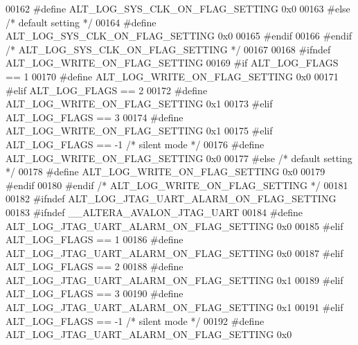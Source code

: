 \begin{DoxyCode}
{{{{00162 \textcolor{preprocessor}{            #define ALT\_LOG\_SYS\_CLK\_ON\_FLAG\_SETTING 0x0}
00163 \textcolor{preprocessor}{        #else }\textcolor{comment}{/* default setting */}\textcolor{preprocessor}{}
00164 \textcolor{preprocessor}{            #define ALT\_LOG\_SYS\_CLK\_ON\_FLAG\_SETTING 0x0}
00165 \textcolor{preprocessor}{        #endif}
00166 \textcolor{preprocessor}{    #endif }\textcolor{comment}{/* ALT\_LOG\_SYS\_CLK\_ON\_FLAG\_SETTING */}\textcolor{preprocessor}{}
00167 
00168 \textcolor{preprocessor}{    #ifndef ALT\_LOG\_WRITE\_ON\_FLAG\_SETTING}
00169 \textcolor{preprocessor}{        #if ALT\_LOG\_FLAGS == 1}
00170 \textcolor{preprocessor}{            #define ALT\_LOG\_WRITE\_ON\_FLAG\_SETTING 0x0}
00171 \textcolor{preprocessor}{        #elif ALT\_LOG\_FLAGS == 2}
00172 \textcolor{preprocessor}{            #define ALT\_LOG\_WRITE\_ON\_FLAG\_SETTING 0x1}
00173 \textcolor{preprocessor}{        #elif ALT\_LOG\_FLAGS == 3}
00174 \textcolor{preprocessor}{            #define ALT\_LOG\_WRITE\_ON\_FLAG\_SETTING 0x1}
00175 \textcolor{preprocessor}{        #elif ALT\_LOG\_FLAGS == -1 }\textcolor{comment}{/* silent mode */}\textcolor{preprocessor}{}
00176 \textcolor{preprocessor}{            #define ALT\_LOG\_WRITE\_ON\_FLAG\_SETTING 0x0}
00177 \textcolor{preprocessor}{        #else }\textcolor{comment}{/* default setting */}\textcolor{preprocessor}{}
00178 \textcolor{preprocessor}{            #define ALT\_LOG\_WRITE\_ON\_FLAG\_SETTING 0x0}
00179 \textcolor{preprocessor}{        #endif}
00180 \textcolor{preprocessor}{    #endif }\textcolor{comment}{/* ALT\_LOG\_WRITE\_ON\_FLAG\_SETTING */}\textcolor{preprocessor}{}
00181 
00182 \textcolor{preprocessor}{    #ifndef ALT\_LOG\_JTAG\_UART\_ALARM\_ON\_FLAG\_SETTING}
00183 \textcolor{preprocessor}{        #ifndef \_\_ALTERA\_AVALON\_JTAG\_UART }
00184 \textcolor{preprocessor}{            #define ALT\_LOG\_JTAG\_UART\_ALARM\_ON\_FLAG\_SETTING 0x0}
00185 \textcolor{preprocessor}{        #elif ALT\_LOG\_FLAGS == 1}
00186 \textcolor{preprocessor}{            #define ALT\_LOG\_JTAG\_UART\_ALARM\_ON\_FLAG\_SETTING 0x0}
00187 \textcolor{preprocessor}{        #elif ALT\_LOG\_FLAGS == 2}
00188 \textcolor{preprocessor}{            #define ALT\_LOG\_JTAG\_UART\_ALARM\_ON\_FLAG\_SETTING 0x1}
00189 \textcolor{preprocessor}{        #elif ALT\_LOG\_FLAGS == 3}
00190 \textcolor{preprocessor}{            #define ALT\_LOG\_JTAG\_UART\_ALARM\_ON\_FLAG\_SETTING 0x1}
00191 \textcolor{preprocessor}{        #elif ALT\_LOG\_FLAGS == -1 }\textcolor{comment}{/* silent mode */}\textcolor{preprocessor}{}
00192 \textcolor{preprocessor}{            #define ALT\_LOG\_JTAG\_UART\_ALARM\_ON\_FLAG\_SETTING 0x0}
}}}}
\end{DoxyCode}
